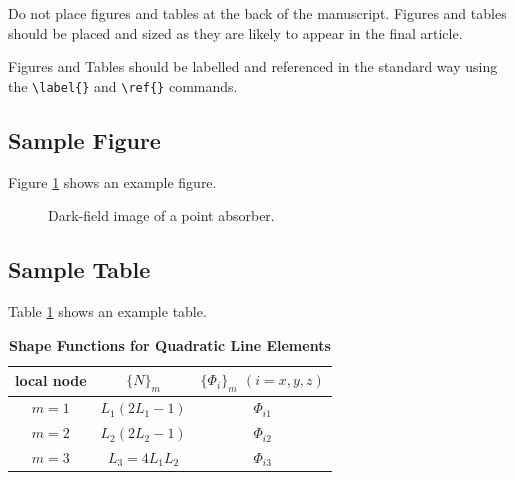\documentclass[9pt,twocolumn,twoside]{opticajnl}
\begin{document}
Do not place figures and tables at the back of the manuscript. Figures and tables should be placed and sized as they are likely to appear in the final article. 

Figures and Tables should be labelled and referenced in the standard way using the \verb|\label{}| and \verb|\ref{}| commands.

\subsection{Sample Figure}

Figure \ref{fig:false-color} shows an example figure.

\begin{figure}[ht]
\centering
{}
\caption{Dark-field image of a point absorber.}
\label{fig:false-color}
\end{figure}

\subsection{Sample Table}

Table \ref{tab:shape-functions} shows an example table.

\begin{table}[htbp]
\centering
\caption{\bf Shape Functions for Quadratic Line Elements}
\begin{tabular}{ccc}
\hline
local node & $\{N\}_m$ & $\{\Phi_i\}_m$ $(i=x,y,z)$ \\
\hline
$m = 1$ & $L_1(2L_1-1)$ & $\Phi_{i1}$ \\
$m = 2$ & $L_2(2L_2-1)$ & $\Phi_{i2}$ \\
$m = 3$ & $L_3=4L_1L_2$ & $\Phi_{i3}$ \\
\hline
\end{tabular}
  \label{tab:shape-functions}
\end{table}
\end{document}
